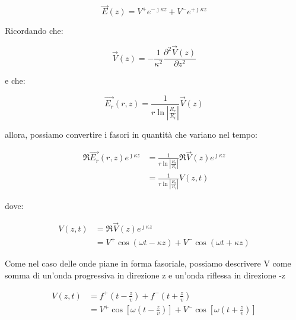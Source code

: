 {\Large  \begin{equation}
    \vec{E} (z) = V^{+} e^{-\jmath \kappa z} + V^{-} e^{+\jmath \kappa z}    
\end{equation}}


Ricordando che: 

{\Large \begin{equation}
    \vec{V} (z) = - \frac{1}{\kappa ^{2}} \frac{\partial^{2} \vec{V} (z)}{\partial z^{2}}
\end{equation}} 

e che: 

{\Large \begin{equation}
    \vec{E_r} (r, z) = \frac{1}{r \ln \left|\frac{R_e}{R_i}\right|} \vec{V}(z)
\end{equation}}

allora, possiamo convertire i fasori in quantità che variano nel tempo: 

{\Large \begin{equation}
    \begin{split}
        \Re{\vec{E_r} (r, z) e^{\jmath \kappa z}} 
        &= \frac{1}{r \ln \left|\frac{R_e}{R_i}\right|} \Re{\vec{V} (z) e^{\jmath \kappa z}} \\
        &= \frac{1}{r \ln \left|\frac{R_e}{R_i}\right|} V(z, t)
    \end{split}
\end{equation}}

dove: 

{\Large \begin{equation}
    \begin{split}
        V(z, t) 
        &=  \Re{\vec{V} (z) e^{\jmath \kappa z}} \\ 
        &= V^{+} \cos(\omega t - \kappa z) + V^{-} \cos(\omega t + \kappa z)     
    \end{split}
\end{equation}}

Come nel caso delle onde piane in forma fasoriale, possiamo descrivere V come somma 
di un'onda progressiva in direzione z e un'onda riflessa in direzione -z 

{\Large \begin{equation}
    \begin{split}
        V(z, t) &= f^{+} (t - \frac{z}{v}) + f^{-} (t + \frac{z}{v}) \\ 
        & = V^{+} \cos [\omega ( t - \frac{z}{v}) ] + V^{-} \cos [\omega ( t + \frac{z}{v}) ] 
    \end{split}
\end{equation}}

